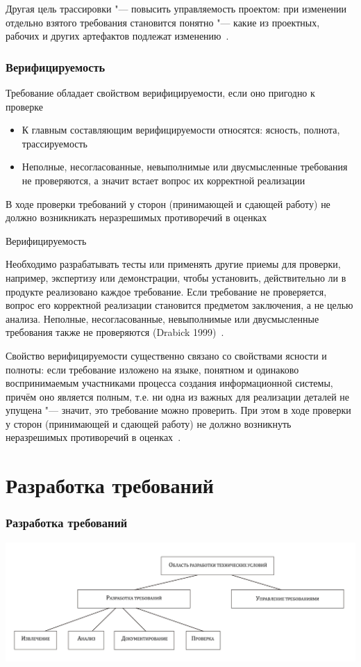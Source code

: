 \documentclass{../industrial-development}
\begin{document}
Другая цель трассировки "--- повысить управляемость проектом: при изменении отдельно взятого требования становится понятно "--- какие из проектных, рабочих и других артефактов подлежат изменению~\cite[с.~18]{Maglinec}.


\begin{frame} \frametitle{Верифицируемость}

Требование обладает свойством \alert{верифицируемости}, если оно пригодно к проверке
 \begin{itemize}
\item К главным составляющим верифицируемости относятся: ясность, полнота, трассируемость
\item Неполные, несогласованные, невыполнимые или двусмысленные требования не проверяются, а значит встает вопрос их корректной реализации
  \end{itemize}
В ходе проверки требований у сторон (принимающей и сдающей работу) не должно возникникать неразрешимых противоречий в оценках


\end{frame}

\lecturenotes

\alert{Верифицируемость}

Необходимо разрабатывать тесты или применять другие приемы для проверки, например, экспертизу или демонстрации, чтобы установить, действительно ли в продукте реализовано каждое требование. Если требование не проверяется, вопрос его корректной реализации становится предметом заключения, а не целью анализа. Неполные, несогласованные, невыполнимые или двусмысленные требования также не проверяются (Drabick 1999)~\cite[с.~24]{Wiegers}.

Свойство верифицируемости существенно связано со свойствами ясности и полноты: если требование изложено на языке, понятном и одинаково воспринимаемым участниками процесса создания информационной системы, причём оно является полным, т.е. ни одна
из важных для реализации деталей не упущена "--- значит, это требование можно проверить. При этом в ходе проверки у сторон (принимающей и сдающей работу) не должно возникнуть неразрешимых противоречий в оценках~\cite[с.~16]{Maglinec}.

\section{Разработка требований}

\begin{frame} \frametitle{Разработка требований}
  \centerline{\includegraphics[width=1.2\textwidth]{pict3.pdf}}
\end{frame}
\end{document}

